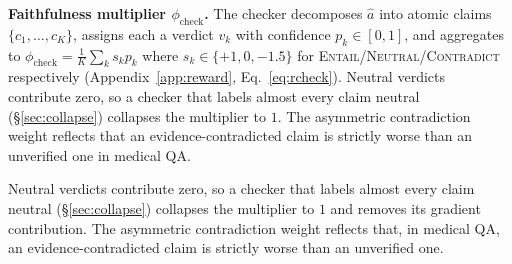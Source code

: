 \documentclass[11pt]{article}
\begin{document}
\textbf{Faithfulness multiplier $\phi_{\text{check}}$.}
The checker decomposes $\hat{a}$ into atomic claims 
$\{c_1,\ldots,c_K\}$, assigns each a verdict 
$v_k$ with confidence $p_k\!\in\![0,1]$, and aggregates 
to $\phi_{\text{check}}=\frac{1}{K}\sum_k s_k p_k$ 
where $s_k\!\in\!\{+1, 0, -1.5\}$ for 
\textsc{Entail}/\textsc{Neutral}/\textsc{Contradict} 
respectively (Appendix~\ref{app:reward}, 
Eq.~\ref{eq:rcheck}). Neutral verdicts contribute 
zero, so a checker that labels almost every claim 
neutral (\S\ref{sec:collapse}) collapses the 
multiplier to $1$. The asymmetric contradiction 
weight reflects that an evidence-contradicted claim 
is strictly worse than an unverified one in medical 
QA.

Neutral verdicts contribute zero, so a checker that
labels almost every claim neutral (\S\ref{sec:collapse})
collapses the multiplier to $1$ and removes its
gradient contribution. The asymmetric contradiction
weight reflects that, in medical QA, an
evidence-contradicted claim is strictly worse than an
unverified one.
\end{document}
